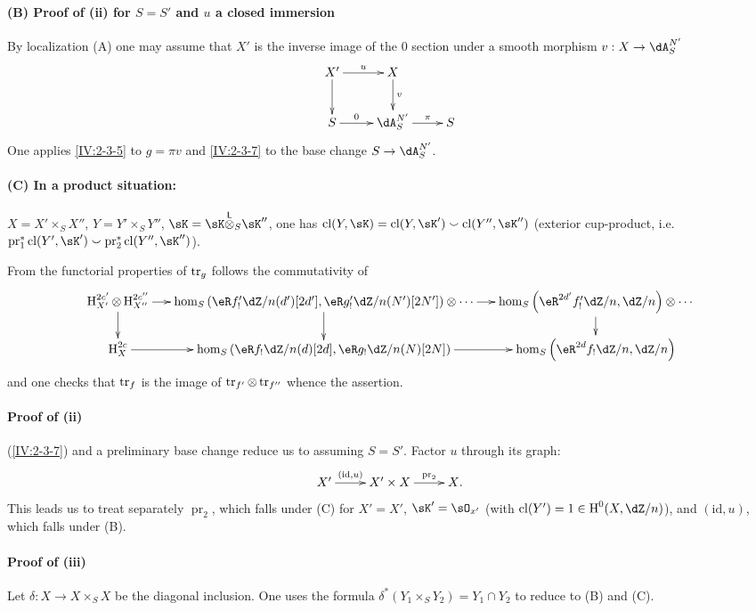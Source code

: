 \paragraph{(B) Proof of (ii) for $S=S'$ and $u$ a closed immersion}
By localization (A) one may assume that $X'$ is the inverse
image of the $0$ section under a smooth morphism $v:X\to \dA_S^{N'}$
\[\xymatrix{
  X' \ar[r]^-u \ar[d]
    & X \ar[d]^-v \\
  S \ar[r]^-0
    & \dA_S^{N'} \ar[r]^-\pi
    & S
}\]
One applies \ref{IV:2-3-5} to $g=\pi v$ and \ref{IV:2-3-7} to the base
change $S\to \dA_S^{N'}$.

\paragraph{(C) In a product situation:}
$X=X'\times_S X''$, $Y=Y'\times_S Y''$, $\sK=\sK\lotimes_S \sK''$, one has
$\cl(Y,\sK) = \cl(Y,\sK')\smallsmile \cl(Y'',\sK'')$ (exterior cup-product,
i.e. $\operatorname{pr}_1^\ast \cl(Y',\sK')\smallsmile \operatorname{pr}_2^\ast \cl(Y'',\sK'')$).

From the functorial properties of $\operatorname{tr}_g$ \cite[XVIII.2.12]{sga4} follows
the commutativity of
\small
\[\xymatrix@=0.5cm{
  \h_{X'}^{2c'}\otimes \h_{X''}^{2 c''}\ar[r] \ar[d]
    & \hom_S\left(\eR f_!' \dZ/n(d')[2 d'],\eR g_!'\dZ/n(N')[2 N']\right)\otimes \cdots \ar[r] \ar[d]
    & \hom_S\left(\eR^{2 d'} f_!' \dZ/n,\dZ/n\right) \otimes \cdots \ar[d] \\
  \h_X^{2 c} \ar[r]
    & \hom_S\left(\eR f_!\dZ/n(d)[2 d],\eR g_!\dZ/n(N)[2 N]\right) \ar[r]
    & \hom_S\left(\eR^{2 d}f_!\dZ/n,\dZ/n\right)
}\]
\normalsize
and one checks that $\operatorname{tr}_f$ is the image of $\operatorname{tr}_{f'}\otimes \operatorname{tr}_{f''}$ whence
the assertion.

\paragraph{Proof of (ii)}
(\ref{IV:2-3-7}) and a preliminary base change reduce us to
assuming $S=S'$. Factor $u$ through its graph:
\[\xymatrix{
  X' \ar[r]^-{(\text{id},u)}
    & X'\times X \ar[r]^-{\operatorname{pr}_2}
    & X \text{.}
}\]
This leads us to treat separately $\operatorname{pr}_2$, which falls
under (C) for $X'=X'$, $\sK'=\sO_{x'}$ (with $\cl(Y')=1\in \h^0(X,\dZ/n)$), and
$(\text{id},u)$, which falls under (B).

\paragraph{Proof of (iii)}
Let $\delta:X\to X\times_S X$ be the diagonal inclusion. One uses the formula
$\delta^\ast(Y_1\times_S Y_2) = Y_1\cap Y_2$ to reduce to
(B) and (C).

